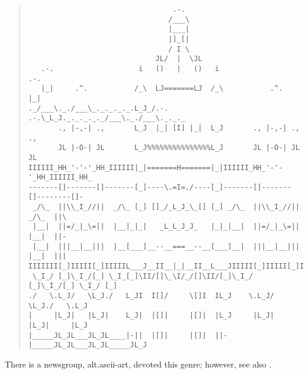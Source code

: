 \begin{figure*}
    \begin{quote}
        \begin{verbatim}
                                  .-.
                                 /___\
                                 |___|
                                 |]_[|
                                 / I \
                              JL/  |  \JL
   .-.                    i   ()   |   ()   i                    .-.
   |_|     .^.           /_\  LJ=======LJ  /_\           .^.     |_|
._/___\._./___\_._._._._.L_J_/.-.     .-.\_L_J._._._._._/___\._./___\._._._
       ., |-,-| .,       L_J  |_| [I] |_|  L_J       ., |-,-| .,        .,
       JL |-O-| JL       L_J%%%%%%%%%%%%%%%L_J       JL |-O-| JL        JL
IIIIII_HH_'-'-'_HH_IIIIII|_|=======H=======|_|IIIIII_HH_'-'-'_HH_IIIIII_HH_
-------[]-------[]-------[_]----\.=I=./----[_]-------[]-------[]--------[]-
 _/\_  ||\\_I_//||  _/\_ [_] []_/_L_J_\_[] [_] _/\_  ||\\_I_//||  _/\_  ||\
 |__|  ||=/_|_\=||  |__|_|_|   _L_L_J_J_   |_|_|__|  ||=/_|_\=||  |__|  ||-
 |__|  |||__|__|||  |__[___]__--__===__--__[___]__|  |||__|__|||  |__|  |||
IIIIIII[_]IIIII[_]IIIIIL___J__II__|_|__II__L___JIIIII[_]IIIII[_]IIIIIIII[_]
 \_I_/ [_]\_I_/[_] \_I_[_]\II/[]\_\I/_/[]\II/[_]\_I_/ [_]\_I_/[_] \_I_/ [_]
./   \.L_J/   \L_J./   L_JI  I[]/     \[]I  IL_J    \.L_J/   \L_J./   \.L_J
|     |L_J|   |L_J|    L_J|  |[]|     |[]|  |L_J     |L_J|   |L_J|     |L_J
|_____JL_JL___JL_JL____|-||  |[]|     |[]|  ||-|_____JL_JL___JL_JL_____JL_J
       \end{verbatim}
    \end{quote}
\end{figure*}

There is a newsgroup, alt.ascii-art, devoted this genre; however, see also
.


